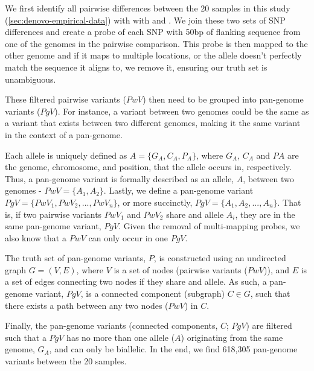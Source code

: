 We first identify all pairwise differences between the 20 samples in this study (\autoref{sec:denovo-empirical-data}) with with  \cite{mummer2018} and  \cite{li2018}. We join these two sets of SNP differences and create a probe of each SNP with 50bp of flanking sequence from one of the genomes in the pairwise comparison. This probe is then mapped to the other genome and if it maps to multiple locations, or the allele doesn't perfectly match the sequence it aligns to, we remove it, ensuring our truth set is unambiguous.

These filtered pairwise variants ($PwV$) then need to be grouped into pan-genome variants ($PgV$). For instance, a variant between two genomes could be the same as a variant that exists between two different genomes, making it the same variant in the context of a pan-genome.

Each allele is uniquely defined as $A=\{G_A,C_A,P_A\}$, where $G_A$, $C_A$ and $PA$ are the genome, chromosome, and position, that the allele occurs in, respectively. Thus, a pan-genome variant is formally described as an allele, $A$, between two genomes - $PwV=\{A_1,A_2\}$. Lastly, we define a pan-genome variant $PgV=\{PwV_1,PwV_2,...,PwV_n\}$, or more succinctly, $PgV=\{A_1,A_2,...,A_n\}$. That is, if two pairwise variants $PwV_1$ and $PwV_2$ share and allele $A_i$, they are in the same pan-genome variant, $PgV$. Given the removal of multi-mapping probes, we also know that a $PwV$ can only occur in one $PgV$.

The truth set of pan-genome variants, $P$, is constructed using an undirected graph $G=(V,E)$, where $V$ is a set of nodes (pairwise variants ($PwV$)), and $E$ is a set of edges connecting two nodes if they share and allele. As such, a pan-genome variant, $PgV$, is a connected component (subgraph) $C \in G$, such that there exists a path between any two nodes ($PwV$) in $C$.

Finally, the pan-genome variants (connected components, $C$; $PgV$) are filtered such that a $PgV$ has no more than one allele ($A$) originating from the same genome, $G_A$, and can only be biallelic. In the end, we find 618,305 pan-genome variants between the 20 samples.